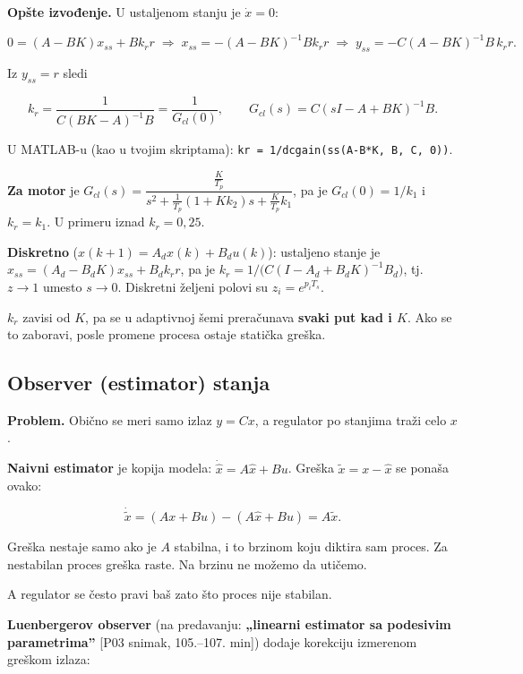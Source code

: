 \documentclass[11pt,a4paper,parskip=half,headsepline,numbers=noenddot]{scrartcl}
\DeclareRobustCommand{\izvor}[1]{{\small\color{izvorC}[#1]}}
\begin{document}
\textbf{Opšte izvođenje.} U ustaljenom stanju je \(\dot x = 0\):

\[0 = (A - BK)x_{ss} + Bk_r r \;\Rightarrow\; x_{ss} = -(A - BK)^{-1}Bk_r r \;\Rightarrow\; y_{ss} = -C(A - BK)^{-1}B\,k_r r .\]

Iz \(y_{ss} = r\) sledi

\[k_r = \frac{1}{C(BK - A)^{-1}B} = \frac{1}{G_{cl}(0)},\qquad G_{cl}(s) = C(sI - A + BK)^{-1}B .\]

U MATLAB-u (kao u tvojim skriptama): \texttt{kr\ =\ 1/\allowbreak{}dcgain(\allowbreak{}ss(\allowbreak{}A-B*K,\allowbreak{}\ B,\allowbreak{}\ C,\allowbreak{}\ 0))}.

\textbf{Za motor} je \(G_{cl}(s) = \dfrac{\frac{K}{T_p}}{s^2 + \frac{1}{T_p}(1+Kk_2)s + \frac{K}{T_p}k_1}\), pa je \(G_{cl}(0) = 1/k_1\) i \(k_r = k_1\). U primeru iznad \(k_r = 0{,}25\).

\textbf{Diskretno} (\(x(k+1) = A_dx(k) + B_du(k)\)): ustaljeno stanje je \(x_{ss} = (A_d - B_dK)x_{ss} + B_dk_r r\), pa je \(k_r = 1/\big(C(I - A_d + B_dK)^{-1}B_d\big)\), tj. \(z \to 1\) umesto \(s \to 0\). Diskretni željeni polovi su \(z_i = e^{p_iT_s}\).

\begin{ispit}
\(k_r\) zavisi od \(K\), pa se u adaptivnoj šemi preračunava \textbf{svaki put kad i \(K\)}. Ako se to zaboravi, posle promene procesa ostaje statička greška.
\end{ispit}

\subsection{Observer (estimator) stanja}

\textbf{Problem.} Obično se meri samo izlaz \(y = Cx\), a regulator po stanjima traži celo \(x\).

\textbf{Naivni estimator} je kopija modela: \(\dot{\hat x} = A\hat x + Bu\). Greška \(\tilde x = x - \hat x\) se ponaša ovako:

\[\dot{\tilde x} = (Ax + Bu) - (A\hat x + Bu) = A\tilde x .\]

Greška nestaje samo ako je \(A\) stabilna, i to brzinom koju diktira sam proces. Za nestabilan proces greška raste. Na brzinu ne možemo da utičemo.

A regulator se često pravi baš zato što proces nije stabilan.

\textbf{Luenbergerov observer} (na predavanju: \textbf{„linearni estimator sa podesivim parametrima''} \izvor{P03 snimak, 105.--107. min}) dodaje korekciju izmerenom greškom izlaza:
\end{document}

